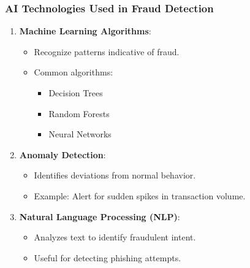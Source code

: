 \documentclass[aspectratio=169]{beamer}
\begin{document}
\begin{frame}[fragile]
    \frametitle{AI Technologies Used in Fraud Detection}
    \begin{enumerate}
        \item \textbf{Machine Learning Algorithms}:
        \begin{itemize}
            \item Recognize patterns indicative of fraud.
            \item Common algorithms:
            \begin{itemize}
                \item Decision Trees
                \item Random Forests
                \item Neural Networks
            \end{itemize}
        \end{itemize}
        \item \textbf{Anomaly Detection}:
        \begin{itemize}
            \item Identifies deviations from normal behavior.
            \item Example: Alert for sudden spikes in transaction volume.
        \end{itemize}
        \item \textbf{Natural Language Processing (NLP)}:
        \begin{itemize}
            \item Analyzes text to identify fraudulent intent.
            \item Useful for detecting phishing attempts.
        \end{itemize}
    \end{enumerate}
\end{frame}
\end{document}
